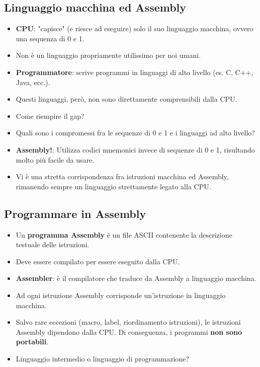 \documentclass[12pt, a4paper]{article}
\begin{document}
\subsection{Linguaggio macchina ed Assembly}
\begin{itemize}
    \item \textbf{CPU}: "capisce" (e riesce ad eseguire) solo il suo linguaggio macchina, ovvero una sequenza di 0 e 1.
    \item Non è un linguaggio propriamente utilissimo per noi umani.
    \item \textbf{Programmatore}: scrive programmi in linguaggi di alto livello (es. C, C++, Java, ecc.).
    \item Questi linguaggi, però, non sono direttamente comprensibili dalla CPU.
    \item Come riempire il gap?
    \item Quali sono i compromessi fra le sequenze di 0 e 1 e i linguaggi ad alto livello?
    \item \textbf{Assembly!}: Utilizza codici mnemonici invece di sequenze di 0 e 1, risultando molto più facile da usare.
    \item Vi è una stretta corrispondenza fra istruzioni macchina ed Assembly, rimanendo sempre un linguaggio strettamente legato alla CPU.
\end{itemize}

\subsection{Programmare in Assembly}
\begin{itemize}
    \item Un \textbf{programma Assembly} è un file ASCII contenente la descrizione testuale delle istruzioni.
    \item Deve essere compilato per essere eseguito dalla CPU.
    \item \textbf{Assembler}: è il compilatore che traduce da Assembly a linguaggio macchina.
    \item Ad ogni istruzione Assembly corrisponde un'istruzione in linguaggio macchina.
    \item Salvo rare eccezioni (macro, label, riordinamento istruzioni), le istruzioni Assembly dipendono dalla CPU. Di conseguenza, i programmi \textbf{non sono portabili}.
    \item Linguaggio intermedio o linguaggio di programmazione?
\end{itemize}
\end{document}
